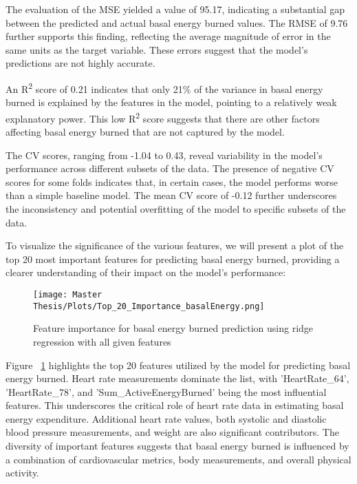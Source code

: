 The evaluation of the MSE yielded a value of 95.17, indicating a substantial gap between the predicted and actual basal energy burned values. The RMSE of 9.76 further supports this finding, reflecting the average magnitude of error in the same units as the target variable. These errors suggest that the model's predictions are not highly accurate.

An R\textsuperscript{2} score of 0.21 indicates that only 21\% of the variance in basal energy burned is explained by the features in the model, pointing to a relatively weak explanatory power. This low R\textsuperscript{2} score suggests that there are other factors affecting basal energy burned that are not captured by the model.

The CV scores, ranging from -1.04 to 0.43, reveal variability in the model's performance across different subsets of the data. The presence of negative CV scores for some folds indicates that, in certain cases, the model performs worse than a simple baseline model. The mean CV score of -0.12 further underscores the inconsistency and potential overfitting of the model to specific subsets of the data.

To visualize the significance of the various features, we will present a plot of the top 20 most important features for predicting basal energy burned, providing a clearer understanding of their impact on the model's performance:

\FloatBarrier
\begin{figure}[h!]
    \centering
    \texttt{[image: Master Thesis/Plots/Top\_20\_Importance\_basalEnergy.png]}
      \caption{Feature importance for basal energy burned prediction using ridge regression with all given features}
    \label{fig:featureimportanceRRallbas}
\end{figure}
\FloatBarrier

Figure ~\ref{fig:featureimportanceRRallbas} highlights the top 20 features utilized by the model for predicting basal energy burned. Heart rate measurements dominate the list, with 'HeartRate\_64', 'HeartRate\_78', and 'Sum\_ActiveEnergyBurned' being the most influential features. This underscores the critical role of heart rate data in estimating basal energy expenditure. Additional heart rate values, both systolic and diastolic blood pressure measurements, and weight are also significant contributors. The diversity of important features suggests that basal energy burned is influenced by a combination of cardiovascular metrics, body measurements, and overall physical activity.

